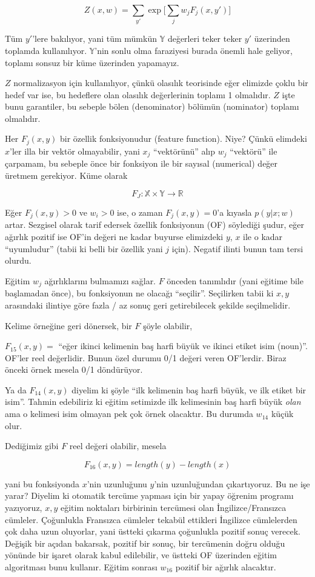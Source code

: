 \documentclass[12pt,fleqn]{article}\usepackage{../../common}
\begin{document}
$$ Z(x,w) = \sum_{y'} \exp \big[ \sum_j w_j F_j(x,y') \big] $$

Tüm $y'$'lere bakılıyor, yani tüm mümkün $\mathbb{Y}$ değerleri teker teker
$y'$ üzerinden toplamda kullanılıyor. $\mathbb{Y}$'nin sonlu olma
faraziyesi burada önemli hale geliyor, toplamı sonsuz bir küme üzerinden
yapamayız. 

$Z$ normalizasyon için kullanılıyor, çünkü olasılık teorisinde eğer
elimizde çoklu bir hedef var ise, bu hedeflere olan olasılık değerlerinin
toplamı 1 olmalıdır. $Z$ işte bunu garantiler, bu sebeple bölen
(denominator) bölümün (nominator) toplamı olmalıdır. 

Her $F_j(x,y)$ bir özellik fonksiyonudur (feature function). Niye? Çünkü
elimdeki $x$'ler illa bir vektör olmayabilir, yani $x_j$ ``vektörünü'' alıp
$w_j$ ``vektörü'' ile çarpamam, bu sebeple önce bir fonksiyon ile bir
sayısal (numerical) değer üretmem gerekiyor. Küme olarak

$$ F_J: \mathbb{X} \times \mathbb{Y} \to \mathbb{R} $$

Eğer $ F_j(x,y) > 0 $ ve $w_i > 0$ ise, o zaman $F_j(x,y) = 0$'a kıyasla
$p(y|x;w)$ artar. Sezgisel olarak tarif edersek özellik fonksiyonun (OF)
söylediği şudur, eğer ağırlık pozitif ise OF'in değeri ne
kadar buyurse elimizdeki $y$, $x$ ile o kadar ``uyumludur'' (tabii ki belli
bir özellik yani $j$ için). Negatif ilinti bunun tam tersi olurdu. 

Eğitim $w_j$ ağırlıklarını bulmamızı sağlar. $F$ önceden tanımlıdır (yani
eğitime bile başlamadan önce), bu fonksiyonun ne olacağı
``seçilir''. Seçilirken tabii ki $x,y$ arasındaki ilintiye göre fazla / az
sonuç geri getirebilecek şekilde seçilmelidir. 

Kelime örneğine geri dönersek, bir $F$ şöyle olabilir, 

$ F_{15}(x,y) =$ ``eğer ikinci kelimenin baş harfi büyük ve ikinci etiket
isim (noun)''. OF'ler reel değerlidir. Bunun özel durumu 0/1 değeri veren
OF'lerdir. Biraz önceki örnek mesela 0/1 döndürüyor.

Ya da $F_{14}(x,y)$ diyelim ki şöyle ``ilk kelimenin baş harfi büyük, ve
ilk etiket bir isim''. Tahmin edebiliriz ki eğitim setimizde ilk
kelimesinin baş harfi büyük {\em olan} ama o kelimesi isim olmayan pek çok
örnek olacaktır. Bu durumda $w_{14}$ küçük olur. 

Dediğimiz gibi $F$ reel değeri olabilir, mesela

$$ F_{16}(x,y) = length(y) - length(x) $$

yani bu fonksiyonda $x$'nin uzunluğunu $y$'nin uzunluğundan
çıkartıyoruz. Bu ne işe yarar? Diyelim ki otomatik tercüme yapması için bir
yapay öğrenim programı yazıyoruz, $x,y$ eğitim noktaları birbirinin
tercümesi olan İngilizce/Fransızca cümleler. Çoğunlukla Fransızca cümleler
tekabül ettikleri İngilizce cümlelerden çok daha uzun oluyorlar, yani
üstteki çıkarma çoğunlukla pozitif sonuç verecek. Değişik bir açıdan
bakarsak, pozitif bir sonuç, bir tercümenin doğru olduğu yönünde bir işaret
olarak kabul edilebilir, ve üstteki OF üzerinden eğitim algoritması bunu
kullanır. Eğitim sonrası $w_{16}$ pozitif bir ağırlık alacaktır.
\end{document}
